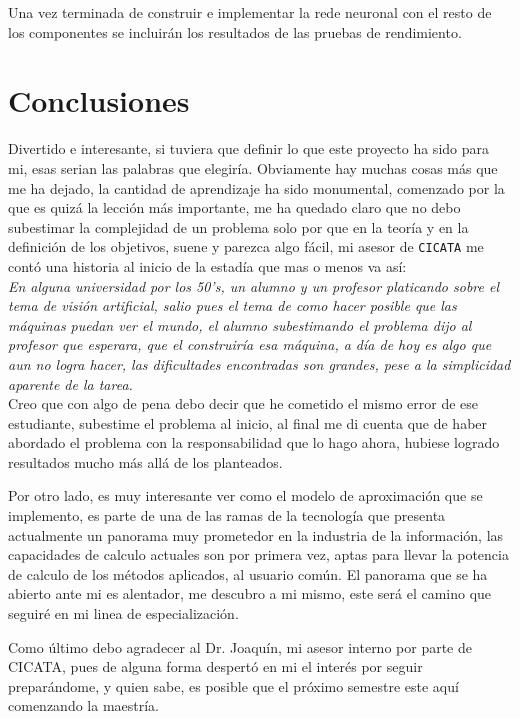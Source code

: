 \documentclass[12pt]{book} %
\begin{document}
	Una vez terminada de construir e implementar la rede neuronal con el resto de los componentes se incluirán los resultados de las pruebas de 
	rendimiento.
	

\section{Conclusiones}
	Divertido e interesante, si tuviera que definir lo que este proyecto ha sido para mi, esas serian las palabras que elegiría.
	Obviamente hay muchas cosas más que me ha dejado, la cantidad de aprendizaje ha sido monumental, comenzado por la que es quizá la lección más
	importante, me ha quedado claro que no debo subestimar la complejidad de un problema solo por que en la teoría y en la definición de los 
	objetivos, suene y parezca algo fácil, mi asesor de \texttt{CICATA} me contó una historia  al inicio de la estadía que mas o menos va así:\\
	\textit{En alguna universidad por los 50's, un alumno y un profesor platicando sobre el tema de visión artificial, salio pues el tema de 
	como hacer posible que las máquinas puedan ver el mundo, el alumno subestimando el problema dijo al profesor que esperara, que el construiría
	esa máquina, a día de hoy es algo que aun no logra hacer, las dificultades encontradas son grandes, pese a la simplicidad aparente de la tarea.}\\
	
	Creo que con algo de pena debo decir que he cometido el mismo error de ese estudiante, subestime el problema al inicio, al final me di cuenta 
	que de haber abordado el problema con la responsabilidad que lo hago ahora, hubiese logrado resultados mucho más allá de los planteados.
	
	Por otro lado, es muy interesante ver como el modelo de aproximación que se implemento, es parte de una de las ramas de la tecnología que 
	presenta actualmente un panorama muy prometedor en la industria de la información, las capacidades de calculo actuales son por primera vez, aptas
	para llevar la potencia de calculo de los métodos aplicados, al usuario común.
	El panorama que se ha abierto ante mi es alentador, me descubro a mi mismo, este será el camino que seguiré en mi linea de especialización.
	
	Como último debo agradecer al Dr. Joaquín, mi asesor interno por parte de CICATA, pues de alguna forma despertó en mi el interés por seguir 
	preparándome, y quien sabe, es posible que el próximo semestre este aquí comenzando la maestría.
	
\end{document}
